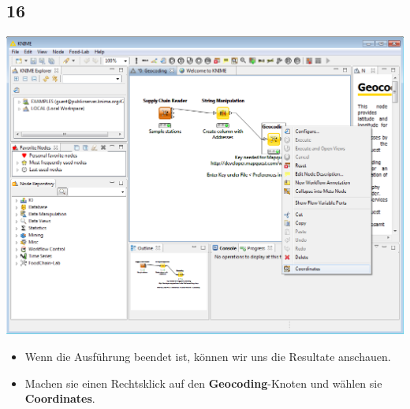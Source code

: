 \documentclass{beamer}
\begin{document}
\subsection{16}
\begin{frame}
	\begin{center}
  		\includegraphics[height=0.6\textheight]{16.png}
	\end{center}
	\begin{itemize}
		\item Wenn die Ausführung beendet ist, können wir uns die Resultate anschauen.
		\item Machen sie einen Rechtsklick auf den \textbf{Geocoding}-Knoten und wählen sie \textbf{Coordinates}.
	\end{itemize}
\end{frame}
\end{document}
